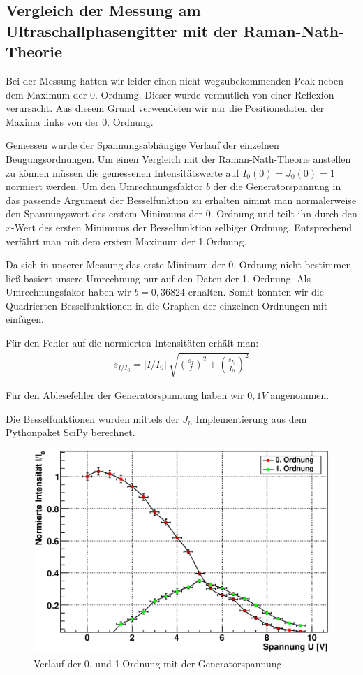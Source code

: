\documentclass[12pt]{article}
\begin{document}
\subsection{Vergleich der Messung am Ultraschallphasengitter mit der Raman-Nath-Theorie}
Bei der Messung hatten wir leider einen nicht wegzubekommenden Peak neben dem Maximum der 0. Ordnung. Dieser wurde vermutlich von einer Reflexion
verursacht. Aus diesem Grund verwendeten wir nur die Positionsdaten der Maxima links von der 0. Ordnung.

Gemessen wurde der Spannungsabhängige Verlauf der einzelnen Beugungsordnungen. Um einen Vergleich mit der Raman-Nath-Theorie anstellen zu können müssen
die gemessenen Intensitätswerte auf $I_0(0) = J_0(0) = 1$ normiert werden. Um den Umrechnungsfaktor $b$ der die Generatorspannung in das passende Argument
der Besselfunktion zu erhalten nimmt man normalerweise den Spannungswert des erstem Minimums der 0. Ordnung und teilt ihn durch den $x$-Wert des ersten
Minimums der Besselfunktion selbiger Ordnung. Entsprechend verfährt man mit dem erstem Maximum der 1.Ordnung. 

Da sich in unserer Messung das erste Minimum der 0. Ordnung nicht bestimmen ließ basiert unsere Umrechnung nur auf den Daten der 1. Ordnung.
Als Umrechnungsfakor haben wir $b = 0,36824$ erhalten. Somit konnten wir die Quadrierten Besselfunktionen in die Graphen der einzelnen Ordnungen mit 
einfügen.

Für den Fehler auf die normierten Intensitäten erhält man:
\begin{align}
 s_{I/I_0} = \lvert I/I_0 \rvert ~ \sqrt{\left(\frac{s_I}{I}\right)^2 + \left(\frac{s_{I_0}}{I_0}\right)^2}
\end{align}

Für den Ablesefehler der Generatorspannung haben wir $0,1V$ angenommen.

Die Besselfunktionen wurden mittels der $J_n$ Implementierung aus dem Pythonpaket SciPy berechnet.

\begin{figure}[H]  
\centering
\includegraphics[width=0.9\linewidth]{pictures/raman0+1o.eps}
\caption{Verlauf der 0. und 1.Ordnung mit der Generatorspannung}
\end{figure}
\end{document}
